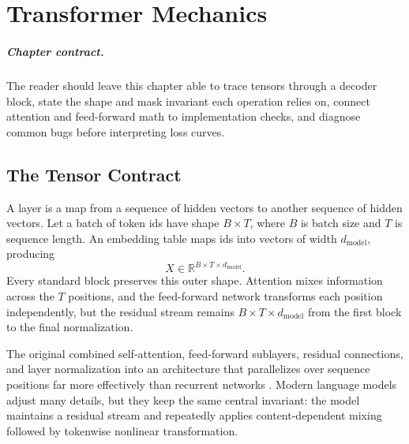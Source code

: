 \chapter{Transformer Mechanics}
\label{ch:transformer-mechanics}


\paragraph{Chapter contract.} The reader should leave this chapter able to trace tensors through a decoder block, state the shape and mask invariant each operation relies on, connect attention and feed-forward math to implementation checks, and diagnose common bugs before interpreting loss curves.

\section{The Tensor Contract}
\label{sec:transformer-tensor-contract}

A \transformer layer is a map from a sequence of hidden vectors to another sequence of hidden vectors. Let a batch of token ids have shape $B \times T$, where $B$ is batch size and $T$ is sequence length. An embedding table maps ids into vectors of width $d_{\mathrm{model}}$, producing
\begin{equation}
  X \in \mathbb{R}^{B \times T \times d_{\mathrm{model}}}.
\end{equation}
Every standard \transformer block preserves this outer shape. Attention mixes information across the $T$ positions, and the feed-forward network transforms each position independently, but the residual stream remains $B \times T \times d_{\mathrm{model}}$ from the first block to the final normalization.

The original \transformer combined self-attention, feed-forward sublayers, residual connections, and layer normalization into an architecture that parallelizes over sequence positions far more effectively than recurrent networks \cite{vaswani2017attention}. Modern language models adjust many details, but they keep the same central invariant: the model maintains a residual stream and repeatedly applies content-dependent mixing followed by tokenwise nonlinear transformation.

